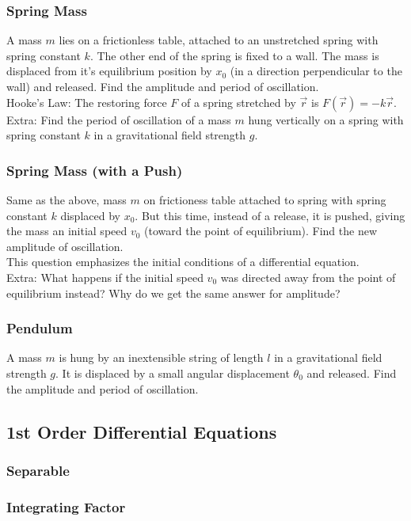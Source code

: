\documentclass{article}
\begin{document}
\subsubsection{Spring Mass}
A mass $m$ lies on a frictionless table, attached to an unstretched spring with spring constant $k$. The other end of the spring is fixed to a wall. The mass is displaced from it's equilibrium position by $x_0$ (in a direction perpendicular to the wall) and released. Find the amplitude and period of oscillation.\\[10pt]
Hooke's Law: The restoring force $F$ of a spring stretched by $\vec{r}$ is $F(\vec{r}) = -k\vec{r}$.\\[10pt]
Extra: Find the period of oscillation of a mass $m$ hung vertically on a spring with spring constant $k$ in a gravitational field strength $g$.

\subsubsection{Spring Mass (with a Push)}
Same as the above, mass $m$ on frictioness table attached to spring with spring constant $k$ displaced by $x_0$. But this time, instead of a release, it is pushed, giving the mass an initial speed $v_0$ (toward the point of equilibrium). Find the new amplitude of oscillation.\\[10pt]
This question emphasizes the initial conditions of a differential equation.\\[10pt]
Extra: What happens if the initial speed $v_0$ was directed away from the point of equilibrium instead? Why do we get the same answer for amplitude? 

\subsubsection{Pendulum}
A mass $m$ is hung by an inextensible string of length $l$ in a gravitational field strength $g$. It is displaced by a small angular displacement $\theta_0$ and released. Find the amplitude and period of oscillation.

\subsection{1st Order Differential Equations}
\subsubsection{Separable}
\subsubsection{Integrating Factor}
\end{document}

